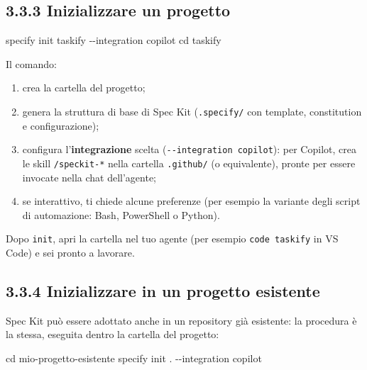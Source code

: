\documentclass[
  italian,
  10pt,
]{book}
\newenvironment{Shaded}{\begin{snugshade}}{\end{snugshade}}
\newcommand{\AttributeTok}[1]{\textcolor[rgb]{0.13,0.29,0.53}{#1}}
\newcommand{\BuiltInTok}[1]{#1}
\newcommand{\ExtensionTok}[1]{#1}
\newcommand{\NormalTok}[1]{#1}
\providecommand{\tightlist}{%
  \setlength{\itemsep}{0pt}\setlength{\parskip}{0pt}}
\begin{document}
\subsection{3.3.3 Inizializzare un
progetto}\label{inizializzare-un-progetto}

\begin{Shaded}
\begin{Highlighting}[]
\ExtensionTok{specify}\NormalTok{ init taskify }\AttributeTok{{-}{-}integration}\NormalTok{ copilot}
\BuiltInTok{cd}\NormalTok{ taskify}
\end{Highlighting}
\end{Shaded}

Il comando:

\begin{enumerate}
\def\labelenumi{\arabic{enumi}.}
\tightlist
\item
  crea la cartella del progetto;
\item
  genera la struttura di base di Spec Kit (\texttt{.specify/} con
  template, constitution e configurazione);
\item
  configura l'\textbf{integrazione} scelta
  (\texttt{-\/-integration\ copilot}): per Copilot, crea le skill
  \texttt{/speckit-*} nella cartella \texttt{.github/} (o equivalente),
  pronte per essere invocate nella chat dell'agente;
\item
  se interattivo, ti chiede alcune preferenze (per esempio la variante
  degli script di automazione: Bash, PowerShell o Python).
\end{enumerate}

Dopo \texttt{init}, apri la cartella nel tuo agente (per esempio
\texttt{code\ taskify} in VS Code) e sei pronto a lavorare.

\subsection{3.3.4 Inizializzare in un progetto
esistente}\label{inizializzare-in-un-progetto-esistente}

Spec Kit può essere adottato anche in un repository già esistente: la
procedura è la stessa, eseguita dentro la cartella del progetto:

\begin{Shaded}
\begin{Highlighting}[]
\BuiltInTok{cd}\NormalTok{ mio{-}progetto{-}esistente}
\ExtensionTok{specify}\NormalTok{ init . }\AttributeTok{{-}{-}integration}\NormalTok{ copilot}
\end{Highlighting}
\end{Shaded}
\end{document}
